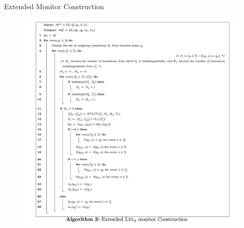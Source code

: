 \begin{frame}{Extended \LTLtri Monitor Construction}

\vspace{-1mm}
\begin{figure}
 \centering
 \includegraphics[scale=.25, angle=-360]{figures/ExltlMon}
 \end{figure}

 \end{frame}
 





